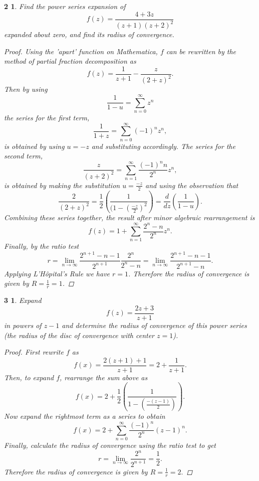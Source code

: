 \documentclass[10pt]{amsart}
\begin{document}
  \newtheorem*{2}{2}
  \begin{2}
    Find the power series expansion of \[f(z) = \frac{4+3z}{(z+1)(z+2)^2}\] expanded about zero, and find its radius of convergence.
    \begin{proof}
      Using the 'apart' function on Mathematica, \(f\) can be rewritten by the method of partial fraction decomposition as \[f(z) = \frac{1}{z+1} - \frac{z}{(2+z)^2}.\]
      Then by using \[\frac{1}{1-u} = \sum_{n=0}^{\infty} z^n\] the series for the first term, \[\frac{1}{1+z} = \sum_{n=0}^{\infty} (-1)^nz^n,\] is obtained by using \(u = -z\) and substituting accordingly.
      The series for the second term, \[\frac{z}{(z+2)^2} = \sum_{n=1}^{\infty} \frac{(-1)^{n}n}{2^{n}}z^n,\] is obtained by making the substitution \(u = \frac{-z}{2}\) and using the observation that 
      \[\frac{2}{(2+z)^2} = \frac{1}{2}\left(\frac{1}{(1 - (\frac{-z}{2})^2}\right) = \frac{d}{dz}\left(\frac{1}{1-u}\right).\]
      Combining these series together, the result after minor algebraic rearrangement is \[f(z) = 1 + \sum_{n=1}^{\infty}\frac{2^n-n}{2^n}z^n.\]
      Finally, by the ratio test \[r = \lim_{n\rightarrow\infty} \frac{2^{n+1}-n-1}{2^{n+1}}\frac{2^n}{2^n - n} = \lim_{n\rightarrow\infty} \frac{2^{n+1} - n - 1}{2^{n+1} - n}.\]
      Applying L'H\^opital's Rule we have \(r = 1\).
      Therefore the radius of convergence is given by \(R = \frac{1}{r} = 1\).
    \end{proof}
  \end{2}

  \newtheorem*{3}{3}
  \begin{3}
    Expand \[f(z) = \frac{2z+3}{z+1}\] in powers of \(z-1\) and determine the radius of convergence of this power series (the radius of the disc of convergence with center \(z=1\)). 
    \begin{proof}
      First rewrite \(f\) as \[f(x) = \frac{2(z+1) + 1}{z+1} = 2 + \frac{1}{z+1}.\] 
      Then, to expand \(f\), rearrange the sum above as \[f(x) = 2 + \frac{1}{2}\left(\frac{1}{1 - (\frac{-(z-1)}{2})}\right).\] 
      Now expand the rightmost term as a series to obtain \[f(x) = 2 + \sum_{n=0}^{\infty}\frac{(-1)^n}{2^n}(z-1)^n.\]
      Finally, calculate the radius of convergence using the ratio test to get \[r = \lim_{n\rightarrow\infty}\frac{2^n}{2^{n+1}} = \frac{1}{2}.\]
      Therefore the radius of convergence is given by \(R = \frac{1}{r} = 2.\)
    \end{proof}
  \end{3}
\end{document}
